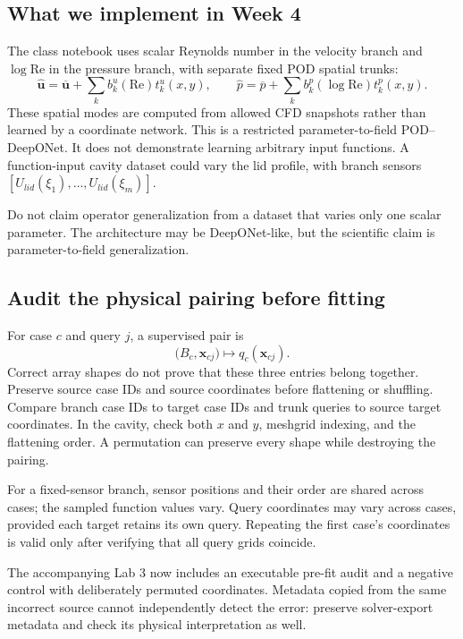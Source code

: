 \documentclass[11pt]{article}
\newcommand{\Rey}{\mathrm{Re}}
\begin{document}
\subsection{What we implement in Week 4}
The class notebook uses scalar Reynolds number in the velocity branch and
$\log\Rey$ in the pressure branch, with separate fixed POD spatial trunks:
\[
\widehat{\boldsymbol{u}}=\overline{\boldsymbol{u}}+
\sum_k b_k^u(\Rey)t_k^u(x,y),\qquad
\widehat p=\overline p+\sum_k b_k^p(\log\Rey)t_k^p(x,y).
\]
These spatial modes are computed from allowed CFD snapshots rather than learned
by a coordinate network. This is a restricted parameter-to-field POD--DeepONet.
It does not demonstrate learning arbitrary input functions. A function-input
cavity dataset could vary the lid profile, with branch sensors
$[U_{lid}(\xi_1),\ldots,U_{lid}(\xi_m)]$.

\begin{warningbox}
Do not claim operator generalization from a dataset that varies only one scalar parameter. The architecture may be DeepONet-like, but the scientific claim is parameter-to-field generalization.
\end{warningbox}


\subsection{Audit the physical pairing before fitting}
For case $c$ and query $j$, a supervised pair is
\[
\bigl(B_c,\boldsymbol{x}_{cj}\bigr)\longmapsto q_c(\boldsymbol{x}_{cj}).
\]
Correct array shapes do not prove that these three entries belong together.
Preserve source case IDs and source coordinates before flattening or shuffling.
Compare branch case IDs to target case IDs and trunk queries to source target
coordinates. In the cavity, check both $x$ and $y$, meshgrid indexing, and the
flattening order. A permutation can preserve every shape while destroying the pairing.

For a fixed-sensor branch, sensor positions and their order are shared across
cases; the sampled function values vary. Query coordinates may vary across
cases, provided each target retains its own query. Repeating the first case's
coordinates is valid only after verifying that all query grids coincide.

The accompanying Lab 3 now includes an executable pre-fit audit and a negative
control with deliberately permuted coordinates. Metadata copied from the same
incorrect source cannot independently detect the error: preserve solver-export
metadata and check its physical interpretation as well.
\end{document}
